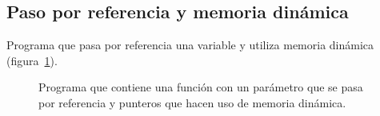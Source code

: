 \subsection{Paso por referencia y memoria dinámica}
Programa que pasa por referencia una variable y utiliza memoria dinámica
(figura~\ref{fig:refdin}).
\begin{figure}[htbp]
    \centering
    
    \caption{Programa que contiene una función con un parámetro que se pasa por
    referencia y punteros que hacen uso de memoria dinámica.}
    \label{fig:refdin}
\end{figure}
